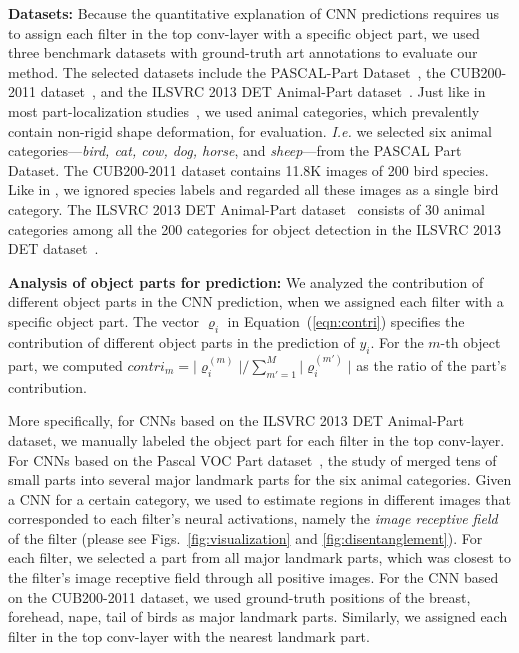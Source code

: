 \documentclass[10pt,twocolumn,letterpaper]{article}
\begin{document}
\textbf{Datasets:} Because the quantitative explanation of CNN predictions requires us to assign each filter in the top conv-layer with a specific object part, we used three benchmark datasets with ground-truth art annotations to evaluate our method. The selected datasets include the PASCAL-Part Dataset~\cite{SemanticPart}, the CUB200-2011 dataset~\cite{CUB200}, and the ILSVRC 2013 DET Animal-Part dataset~\cite{explanatoryGraph}. Just like in most part-localization studies~\cite{SemanticPart,explanatoryGraph}, we used animal categories, which prevalently contain non-rigid shape deformation, for evaluation. \emph{I.e.} we selected six animal categories---\textit{bird, cat, cow, dog, horse}, and \textit{sheep}---from the PASCAL Part Dataset. The CUB200-2011 dataset contains 11.8K images of 200 bird species. Like in \cite{ActivePart,CNNSemanticPart}, we ignored species labels and regarded all these images as a single bird category. The ILSVRC 2013 DET Animal-Part dataset~\cite{explanatoryGraph} consists of 30 animal categories among all the 200 categories for object detection in the ILSVRC 2013 DET dataset~\cite{ImageNet}.

\textbf{Analysis of object parts for prediction:} We analyzed the contribution of different object parts in the CNN prediction, when we assigned each filter with a specific object part. The vector ${\boldsymbol\varrho}_{i}$ in Equation~(\ref{eqn:contri}) specifies the contribution of different object parts in the prediction of $y_{i}$. For the $m$-th object part, we computed {\small$contri_{m}\!=\!\vert\varrho_{i}^{(m)}\vert/{\sum_{m'=1}^{M}\vert\varrho_{i}^{(m')}\vert}$} as the ratio of the part's contribution.

More specifically, for CNNs based on the ILSVRC 2013 DET Animal-Part dataset, we manually labeled the object part for each filter in the top conv-layer. For CNNs based on the Pascal VOC Part dataset~\cite{SemanticPart}, the study of \cite{interpretableCNN} merged tens of small parts into several major landmark parts for the six animal categories. Given a CNN for a certain category, we used \cite{CNNSemanticDeep} to estimate regions in different images that corresponded to each filter's neural activations, namely the \textit{image receptive field} of the filter (please see Figs.~\ref{fig:visualization} and \ref{fig:disentanglement}). For each filter, we selected a part from all major landmark parts, which was closest to the filter's image receptive field through all positive images. For the CNN based on the CUB200-2011 dataset, we used ground-truth positions of the breast, forehead, nape, tail of birds as major landmark parts. Similarly, we assigned each filter in the top conv-layer with the nearest landmark part.
\end{document}
